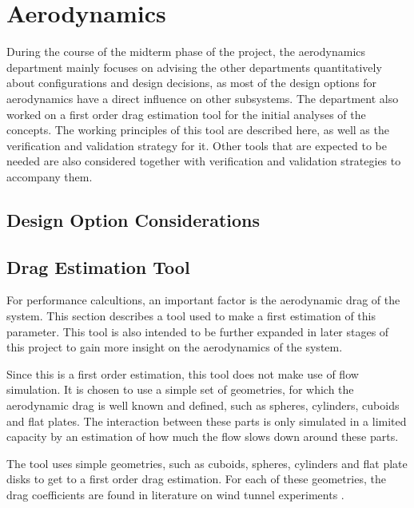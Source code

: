 \chapter{Aerodynamics}
During the course of the midterm phase of the project, the aerodynamics department mainly focuses on advising the other departments quantitatively about configurations and design decisions, as most of the design options for aerodynamics have a direct influence on other subsystems. The department also worked on a first order drag estimation tool for the initial analyses of the concepts. The working principles of this tool are described here, as well as the verification and validation strategy for it. Other tools that are expected to be needed are also considered together with verification and validation strategies to accompany them.\\

\section{Design Option Considerations}

\section{Drag Estimation Tool}
For performance calcultions, an important factor is the aerodynamic drag of the system. This section describes a tool used to make a first estimation of this parameter. This tool is also intended to be further expanded in later stages of this project to gain more insight on the aerodynamics of the system.\par
Since this is a first order estimation, this tool does not make use of flow simulation. It is chosen to use a simple set of geometries, for which the aerodynamic drag is well known and defined, such as spheres, cylinders, cuboids and flat plates. The interaction between these parts is only simulated in a limited capacity by an estimation of how much the flow slows down around these parts.

The tool uses simple geometries, such as cuboids, spheres, cylinders and flat plate disks to get to a first order drag estimation. For each of these geometries, the drag coefficients are found in literature on wind tunnel experiments \cite{CuboidFlow}\cite{SphereFlow}\cite{CylinderFlow}\cite{FlatPlateFlow}.
